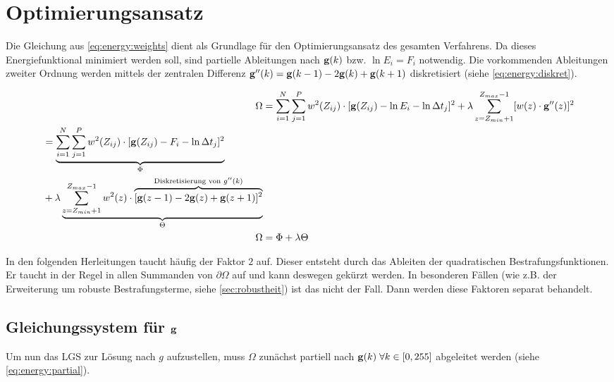 \section{Optimierungsansatz}
\label{sec:ansatz}
Die Gleichung aus \autoref{eq:energy:weights} dient als Grundlage für den Optimierungsansatz des gesamten Verfahrens. Da dieses Energiefunktional minimiert werden soll, sind partielle Ableitungen nach $\mathbf g(k)$ bzw. $\ln E_i = F_i$ notwendig. Die vorkommenden Ableitungen zweiter Ordnung werden mittels der zentralen Differenz $\mathbf g''(k) = \mathbf g(k-1) - 2\mathbf g(k) +\mathbf g(k+1)$ diskretisiert (siehe \autoref{eq:energy:diskret}).

\begin{align}
\Omega &= \sum \limits_{i=1}^{N} \sum \limits_{j=1}^{P}w^2(Z_{ij})\cdot[\mathbf g(Z_{ij}) - \ln E_i - \ln \Delta t_j]^2 + \lambda  \sum \limits_{z=Z_{min}+1}^{Z_{max}-1} [w(z) \cdot \mathbf g''(z)]^2\\
\label{eq:energy:diskret}
\begin{split}
 &= \underbrace{\sum \limits_{i=1}^{N} \sum \limits_{j=1}^{P}w^2(Z_{ij})\cdot[\mathbf g(Z_{ij}) - F_i - \ln \Delta t_j]^2}_{\Phi} \\
 &+ \lambda \underbrace{ \sum \limits_{z=Z_{min}+1}^{Z_{max}-1} w^2(z) \cdot \overbrace{
 	[\mathbf g(z-1)-2\mathbf g(z)+\mathbf g(z+1)]^2
 }^{
 	\text{Diskretisierung von }g''(k)
 }
 }_{\Theta}
 \end{split}\\
 \Omega &= \Phi + \lambda \Theta
\end{align}

In den folgenden Herleitungen taucht häufig der Faktor $2$ auf. Dieser entsteht durch das Ableiten der quadratischen Bestrafungsfunktionen. Er taucht in der Regel in allen Summanden von $\partial \Omega$ auf und kann deswegen gekürzt werden. In besonderen Fällen (wie z.B. der Erweiterung um robuste Bestrafungsterme, siehe \autoref{sec:robustheit}) ist das nicht der Fall. Dann werden diese Faktoren separat behandelt.

\subsection{Gleichungssystem für $\mathbf g$}
Um nun das \gls{LGS} zur Lösung nach $g$ aufzustellen, muss $\Omega$ zunächst partiell nach $\mathbf g(k) \; \forall k \in [0,255]$ abgeleitet werden (siehe \autoref{eq:energy:partial}).

